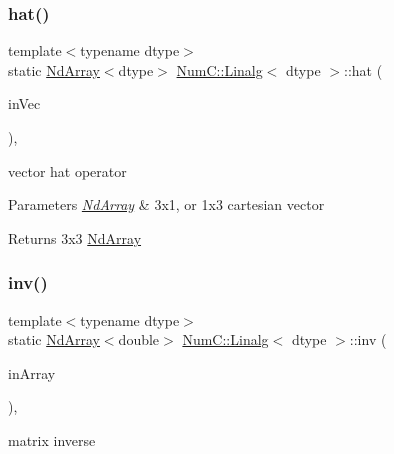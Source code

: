 \subsubsection{\texorpdfstring{hat()}{hat()}\hspace{0.1cm}{\footnotesize\ttfamily [2/2]}}
{\footnotesize\ttfamily template$<$typename dtype$>$ \\
static \mbox{\hyperlink{class_num_c_1_1_nd_array}{Nd\+Array}}$<$dtype$>$ \mbox{\hyperlink{class_num_c_1_1_linalg}{Num\+C\+::\+Linalg}}$<$ dtype $>$\+::hat (\begin{DoxyParamCaption}\item[{const \mbox{\hyperlink{class_num_c_1_1_nd_array}{Nd\+Array}}$<$ dtype $>$ \&}]{in\+Vec }\end{DoxyParamCaption})\hspace{0.3cm}{\ttfamily [inline]}, {\ttfamily [static]}}

vector hat operator


\begin{DoxyParams}{Parameters}
{\em \mbox{\hyperlink{class_num_c_1_1_nd_array}{Nd\+Array}}} & 3x1, or 1x3 cartesian vector \\
\hline
\end{DoxyParams}
\begin{DoxyReturn}{Returns}
3x3 \mbox{\hyperlink{class_num_c_1_1_nd_array}{Nd\+Array}} 
\end{DoxyReturn}
\mbox{\label{class_num_c_1_1_linalg_a8391fecf007442cc681631ad02d4c637}} 
\subsubsection{\texorpdfstring{inv()}{inv()}}
{\footnotesize\ttfamily template$<$typename dtype$>$ \\
static \mbox{\hyperlink{class_num_c_1_1_nd_array}{Nd\+Array}}$<$double$>$ \mbox{\hyperlink{class_num_c_1_1_linalg}{Num\+C\+::\+Linalg}}$<$ dtype $>$\+::inv (\begin{DoxyParamCaption}\item[{const \mbox{\hyperlink{class_num_c_1_1_nd_array}{Nd\+Array}}$<$ dtype $>$ \&}]{in\+Array }\end{DoxyParamCaption})\hspace{0.3cm}{\ttfamily [inline]}, {\ttfamily [static]}}

matrix inverse

